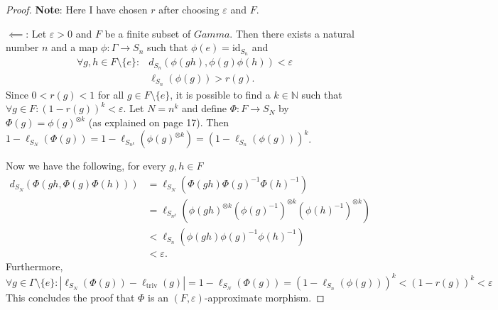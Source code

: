 \documentclass[11pt]{article}
\renewcommand{\epsilon}{\varepsilon}
\newcommand{\idperm}[1]{\mathrm{id}_{S_#1}}
\begin{document}
\begin{itemize}
\begin{proof}
\textbf{Note}: Here I have chosen $r$ after choosing $\epsilon$ and $F$.

\underline{$\impliedby$}: Let $\epsilon > 0$ and $F$ be a finite subset of $Gamma$. Then there exists a natural number $n$ and a map $\phi: \Gamma \to S_n$ such that 
$\phi(e) = \idperm{n}$ and
\begin{align*}
\forall g,h \in F \setminus \{e\} : &d_{S_n}(\phi(gh),\phi(g)\phi(h)) < \epsilon \\
									&\ell_{S_n}(\phi(g)) > r(g).
\end{align*}
Since $0 < r(g) < 1$ for all $g \in F \setminus \{e\}$, it is possible to find a $k \in \mathbb N$ such that $\forall g \in F: (1-r(g))^k < \epsilon$. Let $N = n^k$ and define $\Phi: F \to S_N$ by $\Phi(g) = \phi(g)^{\otimes k}$ (as explained on page 17). Then $1-\ell_{S_N}(\Phi(g)) = 1-\ell_{S_{n^k}}(\phi(g)^{\otimes k}) = (1-\ell_{S_n}(\phi(g)))^k$.

Now we have the following, for every $g,h \in F$
\begin{align*}
d_{S_N}(\Phi(gh, \Phi(g) \Phi(h))) &= \ell_{S_N}(\Phi(gh)\Phi(g)^{-1}\Phi(h)^{-1})\\
&= \ell_{S_{n^k}}(\phi(gh)^{\otimes k}(\phi(g)^{-1})^{\otimes k}(\phi(h)^{-1})^{\otimes k}) \\
&< \ell_{S_n}(\phi(gh)\phi(g)^{-1}\phi(h)^{-1}) \\
&< \epsilon.
\end{align*}
Furthermore, 
\[
\forall g \in \Gamma \setminus \{e\} : |\ell_{S_N}(\Phi(g))-\ell_{\text{triv}}(g)| = 1-\ell_{S_N}(\Phi(g)) = (1-\ell_{S_n}(\phi(g)))^k < (1-r(g))^k
< \epsilon
\]
This concludes the proof that $\Phi$ is an $(F, \epsilon)$-approximate morphism.
\end{proof}

\end{itemize}
\end{document}

